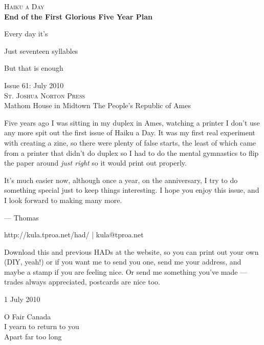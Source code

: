 \documentclass[12pt]{article}
\begin{document}
\begin{center}
{\fontsize{36}{48}\selectfont \textsc{Haiku a Day }} \\[0.5cm]
{\bfseries End of the First Glorious Five Year Plan}
\end{center}

\vspace*{3.5cm}

{\fontsize{20}{40}\selectfont 

Every day it's

Just seventeen syllables

But that is enough

}

\vspace*{5.0cm}
\begin{center}
{\large{Issue 61: July 2010}} \\[5mm]
{\fontsize{8}{8}\selectfont  \textsc{ St. Joshua Norton Press }} \\[1mm]
{\fontsize{6}{6}\selectfont Mathom House in Midtown \textbar The People's Republic of Ames }
\end{center}


\newpage

Five years ago I was sitting in my duplex in Ames, watching a
printer I don't use any more spit out the first issue of Haiku
a Day. It was my first real experiment with creating a zine,
so there were plenty of false starts, the least of which came
from a printer that didn't do duplex so I had to do the mental
gymnastics to flip the paper around {\em just right} so it would
print out properly. 

It's much easier now, although once a year, on the anniversary,
I try to do something special just to keep things interesting.
I hope you enjoy this issue, and I look forward to making
many more.

--- Thomas

http://kula.tproa.net/had/ |  kula@tproa.net

Download this and previous HADs at the website, so you can
print out your own (DIY, yeah!) or if you want me to send
you one, send me your address, and maybe a stamp if you
are feeling nice. Or send me something you've made ---
trades always appreciated, postcards are nice too.


1 July 2010

O Fair Canada \\
I yearn to return to you \\
Apart far too long
\end{document}
